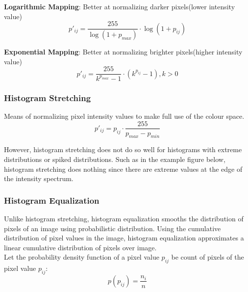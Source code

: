 \documentclass[12pt]{article}
\begin{document}
\textbf{Logarithmic Mapping}: Better at normalizing darker pixels(lower intensity value)
\begin{equation}
p'_{ij} = \frac{255}{\log(1 + p_{max})} \cdot \log(1 + p_{ij})
\end{equation}

\textbf{Exponential Mapping}: Better at normalizing brighter pixels(higher intensity value)
\begin{equation}
p'_{ij} = \frac{255}{k^{p_{max}} - 1} \cdot (k^{p_{ij}} - 1), k > 0
\end{equation}

\subsubsection{Histogram Stretching}

Means of normalizing pixel intensity values to make full use of the colour space. 
\begin{equation}
p'_{ij} = p_{ij} \cdot \frac{255}{p_{max} - p_{min}}
\end{equation}

However, histogram stretching does not do so well for histograms with extreme distributions or spiked distributions. Such as in the example figure below, histogram stretching does nothing since there are extreme values at the edge of the intensity spectrum. \\

\begin{figure}[!h]
\centering
{}
\end{figure}

\subsubsection{Histogram Equalization}

Unlike histogram stretching, histogram equalization smooths the distribution of pixels of an image using probabilistic distribution. Using the cumulative distribution of pixel values in the image, histogram equalization approximates a linear cumulative distribution of pixels over image.\\ 
Let the probability density function of a pixel value $p_{ij}$ be count of pixels of the pixel value $p_{ij}$:
\begin{equation}
p(p_{ij}) = \frac{n_i}{n}
\end{equation}
\end{document}
